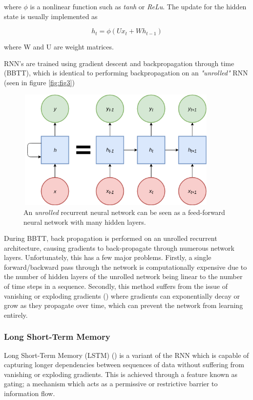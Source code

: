 \noindent
where $\phi$ is a nonlinear function such as \textit{tanh} or \textit{ReLu}. The update for the hidden state is usually implemented as 

\begin{equation}
h_{t} = \phi{(Ux_{t} + Wh_{t-1})}
\end{equation}

\noindent
where W and U are weight matrices.

\par
\noindent
\newline
RNN's are trained using gradient descent and backpropagation through time (BBTT), which is identical to performing backpropagation on an \textit{"unrolled"} RNN (seen in figure \autoref{fig:fig3})

\begin{figure}[h]
	\includegraphics[width=10cm, height=6cm]{./figures/fig3}
	\centering
	\caption[Unrolled Recurrent Neural Network]{An \textit{unrolled} recurrent neural network can be seen as a feed-forward neural network with many hidden layers.}
	\label{fig:fig3}
\end{figure}

\par
\noindent
During BBTT, back propagation is performed on an unrolled recurrent architecture, causing gradients to back-propagate through numerous network layers. Unfortunately, this has a few major problems. Firstly, a single forward/backward pass through the network is computationally expensive due to the number of hidden layers of the unrolled network being linear to the number of time steps in a sequence. Secondly, this method suffers from the issue of vanishing or exploding gradients (\cite{Bengio1994}) where gradients can exponentially decay or grow as they propagate over time, which can prevent the network from learning entirely.
\subsubsection{Long Short-Term Memory}
Long Short-Term Memory (LSTM) (\cite{Hochreiter1997}) is a variant of the RNN which is capable of capturing longer dependencies between sequences of data without suffering from vanishing or exploding gradients. This is achieved through a feature known as gating; a mechanism which acts as a permissive or restrictive barrier to information flow. 

